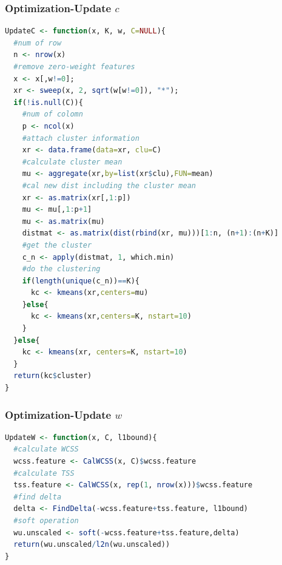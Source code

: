 \documentclass{beamer}
\begin{document}
\begin{frame}[fragile]
\frametitle{Optimization-Update $c$}
\begin{lstlisting}[language=R]
UpdateC <- function(x, K, w, C=NULL){
  #num of row
  n <- nrow(x)
  #remove zero-weight features
  x <- x[,w!=0];
  xr <- sweep(x, 2, sqrt(w[w!=0]), "*");
  if(!is.null(C)){
    #num of colomn
    p <- ncol(x)
    #attach cluster information
    xr <- data.frame(data=xr, clu=C)
    #calculate cluster mean
    mu <- aggregate(xr,by=list(xr$clu),FUN=mean)
    #cal new dist including the cluster mean
    xr <- as.matrix(xr[,1:p])
    mu <- mu[,1:p+1]
    mu <- as.matrix(mu)
    distmat <- as.matrix(dist(rbind(xr, mu)))[1:n, (n+1):(n+K)]
    #get the cluster
    c_n <- apply(distmat, 1, which.min)
    #do the clustering
    if(length(unique(c_n))==K){
      kc <- kmeans(xr,centers=mu)
    }else{
      kc <- kmeans(xr,centers=K, nstart=10)
    }
  }else{
    kc <- kmeans(xr, centers=K, nstart=10)
  }
  return(kc$cluster)
}
\end{lstlisting}
\end{frame}
\begin{frame}[fragile]
\frametitle{Optimization-Update $w$}
\begin{lstlisting}[language=R]
UpdateW <- function(x, C, l1bound){
  #calculate WCSS
  wcss.feature <- CalWCSS(x, C)$wcss.feature
  #calculate TSS
  tss.feature <- CalWCSS(x, rep(1, nrow(x)))$wcss.feature
  #find delta
  delta <- FindDelta(-wcss.feature+tss.feature, l1bound)
  #soft operation
  wu.unscaled <- soft(-wcss.feature+tss.feature,delta)
  return(wu.unscaled/l2n(wu.unscaled))
}
\end{lstlisting}
\end{frame}
\end{document}
